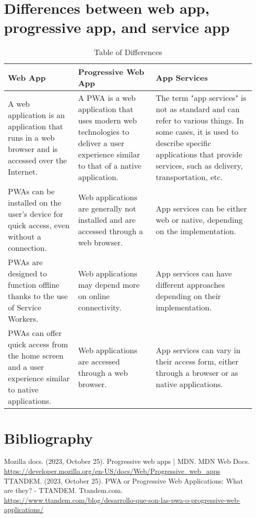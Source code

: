 \documentclass[]{article}
\begin{document}
	\section{Differences between web app, progressive app, and service app}
	\begin{table}[h]
		\centering
		\begin{tabular}{|p{3cm}|p{5cm}|p{5cm}|}
			\hline
			\textbf{Web App} & \textbf{Progressive Web App} & \textbf{App Services} \\
			\hline
			A web application is an application that runs in a web browser and is accessed over the Internet. &
			A PWA is a web application that uses modern web technologies to deliver a user experience similar to that of a native application. 
			&
			The term "app services" is not as standard and can refer to various things. In some cases, it is used to describe specific applications that provide services, such as delivery, transportation, etc. \\
			\hline
			PWAs can be installed on the user's device for quick access, even without a connection.
			&
			Web applications are generally not installed and are accessed through a web browser.
			&
			App services can be either web or native, depending on the implementation.\\
			\hline
			PWAs are designed to function offline thanks to the use of Service Workers.
			&
			Web applications may depend more on online connectivity.
			&
			App services can have different approaches depending on their implementation.\\
			\hline
			PWAs can offer quick access from the home screen and a user experience similar to native applications.
			&
			Web applications are accessed through a web browser.
			&
			App services can vary in their access form, either through a browser or as native applications.
		\end{tabular}
		\caption{Table of Differences}
		\label{tab:differences}
	\end{table}
	
	\clearpage  %
	
	\section{Bibliography}
	\begin{thebibliography}{9}
		 Mozilla docs. (2023, October 25). Progressive web apps | MDN. MDN Web Docs. \url{https://developer.mozilla.org/en-US/docs/Web/Progressive_web_apps}
		 TTANDEM. (2023, October 25). PWA or Progressive Web Applications: What are they? - TTANDEM. Ttandem.com. \url{https://www.ttandem.com/blog/desarrollo-que-son-las-pwa-o-progressive-web-applications/}
	\end{thebibliography}
	
\end{document}
